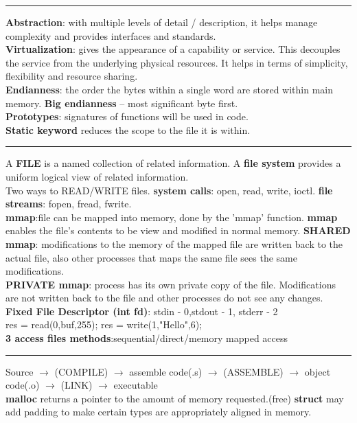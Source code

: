 \documentclass[8pt,a4paper,landscape]{article}
\begin{document}
\begin{spacing}{-1}
\begin{multicols*}{3}
    \hrule \noindent
    \textbf{Abstraction}: with multiple levels of detail / description, it helps manage complexity and provides interfaces and standards. \\
    \textbf{Virtualization}: gives the appearance of a capability or service. This decouples the service from the underlying physical resources. It helps in terms of simplicity, flexibility and resource sharing. \\
    \textbf{Endianness}: the order the bytes within a single word are stored within main memory. 
    \textbf{Big endianness} -- most significant byte first. \\  
    \textbf{Prototypes}: signatures of functions will be used in code. \\
    \textbf{Static keyword} reduces the scope to the file it is within.\\
    \hrule \noindent
    A \textbf{FILE} is a named collection of related information. 
    A \textbf{file system} provides a uniform logical view of related information. \\
    Two ways to READ/WRITE files. \textbf{system calls}: open, read, write, ioctl.
    \textbf{file streams}: fopen, fread, fwrite. \\
    \textbf{mmap}:file can be mapped into memory, done by the 'mmap' function. 
    \textbf{mmap} enables the file's contents to be view and modified in normal memory.
    \textbf{SHARED mmap}: modifications to the memory of the mapped file are written back to the actual file, also other processes that maps the same file sees the same modifications. \\
    \textbf{PRIVATE mmap}: process has its own private copy of the file. Modifications are not written back to the file and other processes do not see any changes. \\
    \textbf{Fixed File Descriptor (int fd)}: stdin - 0,stdout - 1, stderr - 2 \\
    res = read(0,buf,255);   res = write(1,"Hello",6); \\
    \textbf{3 access files methods}:sequential/direct/memory mapped access
    \hrule \noindent
    Source  $\rightarrow$  (COMPILE) $\rightarrow$   assemble code(.s) $\rightarrow$   
    (ASSEMBLE) $\rightarrow$  object code(.o) $\rightarrow$  (LINK) $\rightarrow$  executable \\
    \textbf{malloc} returns a pointer to the amount of memory requested.(free)
    \textbf{struct} may add padding to make certain types are appropriately aligned in memory.
    

\end{multicols*}
\end{spacing}
\end{document}
